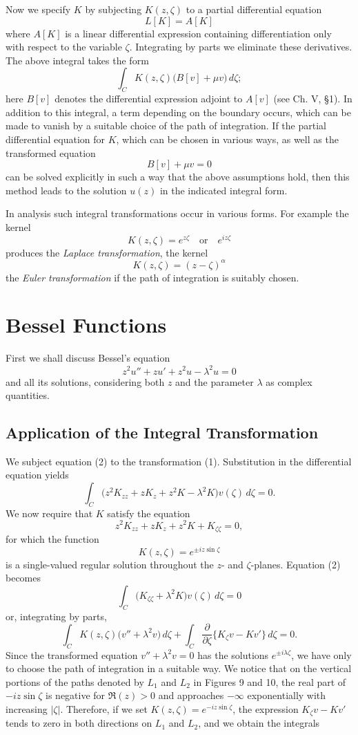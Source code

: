 Now we specify $K$ by subjecting $K(z,\zeta)$ to a partial differential equation
\[
L[K]=A[K]
\]
where $A[K]$ is a linear differential expression containing differentiation only with respect to the variable $\zeta$. Integrating by parts we eliminate these derivatives. The above integral takes the form
\[
\int_CK(z,\zeta)\bigl(B[v]+\mu v\bigr)\,d\zeta;
\]
here $B[v]$ denotes the differential expression adjoint to $A[v]$ (see Ch. V, \S1). In addition to this integral, a term depending on the boundary occurs, which can be made to vanish by a suitable choice of the path of integration. If the partial differential equation for $K$, which can be chosen in various ways, as well as the transformed equation
\[
B[v]+\mu v=0
\]
can be solved explicitly in such a way that the above assumptions hold, then this method leads to the solution $u(z)$ in the indicated integral form.

In analysis such integral transformations occur in various forms. For example the kernel
\[
K(z,\zeta)=e^{z\zeta}\quad\text{or}\quad e^{iz\zeta}
\]
produces the \emph{Laplace transformation}, the kernel
\[
K(z,\zeta)=(z-\zeta)^\alpha
\]
the \emph{Euler transformation} if the path of integration is suitably chosen.

\section{Bessel Functions}
First we shall discuss Bessel's equation
\begin{equation}\tag{2}
z^2u''+zu'+z^2u-\lambda^2u=0
\end{equation}
and all its solutions, considering both $z$ and the parameter $\lambda$ as complex quantities.

\subsection{Application of the Integral Transformation}
We subject equation (2) to the transformation (1). Substitution in the differential equation yields
\[
\int_C\bigl(z^2K_{zz}+zK_z+z^2K-\lambda^2K\bigr)v(\zeta)\,d\zeta=0.
\]
We now require that $K$ satisfy the equation
\[
z^2K_{zz}+zK_z+z^2K+K_{\zeta\zeta}=0,
\]
for which the function
\[
K(z,\zeta)=e^{\pm iz\sin\zeta}
\]
is a single-valued regular solution throughout the $z$- and $\zeta$-planes. Equation (2) becomes
\[
\int_C\bigl(K_{\zeta\zeta}+\lambda^2K\bigr)v(\zeta)\,d\zeta=0
\]
or, integrating by parts,
\[
\int_CK(z,\zeta)\bigl(v''+\lambda^2v\bigr)\,d\zeta
+\int_C\frac{\partial}{\partial\zeta}\{K_\zeta v-Kv'\}\,d\zeta=0.
\]
Since the transformed equation $v''+\lambda^2v=0$ has the solutions $e^{\pm i\lambda\zeta}$, we have only to choose the path of integration in a suitable way. We notice that on the vertical portions of the paths denoted by $L_1$ and $L_2$ in Figures 9 and 10, the real part of $-iz\sin\zeta$ is negative for $\Re(z)>0$ and approaches $-\infty$ exponentially with increasing $|\zeta|$. Therefore, if we set $K(z,\zeta)=e^{-iz\sin\zeta}$, the expression $K_\zeta v-Kv'$ tends to zero in both directions on $L_1$ and $L_2$, and we obtain the integrals

